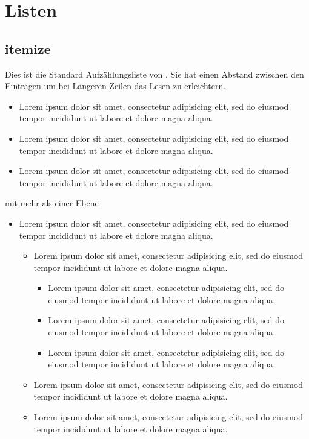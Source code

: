 \section{Listen}

\subsection{itemize}
Dies ist die Standard Aufzählungsliste von \LaTeXe. Sie hat einen Abstand zwischen den Einträgen um bei Längeren Zeilen das Lesen zu erleichtern.

\begin{itemize}
   \item Lorem ipsum dolor sit amet, consectetur adipisicing elit, sed do eiusmod tempor incididunt ut labore et dolore magna aliqua.
%
   \item Lorem ipsum dolor sit amet, consectetur adipisicing elit, sed do eiusmod tempor incididunt ut labore et dolore magna aliqua.
%
   \item Lorem ipsum dolor sit amet, consectetur adipisicing elit, sed do eiusmod tempor incididunt ut labore et dolore magna aliqua.
\end{itemize}

mit mehr als einer Ebene

\begin{itemize}
   \item Lorem ipsum dolor sit amet, consectetur adipisicing elit, sed do eiusmod tempor incididunt ut labore et dolore magna aliqua.
%
   \begin{itemize}
      \item Lorem ipsum dolor sit amet, consectetur adipisicing elit, sed do eiusmod tempor incididunt ut labore et dolore magna aliqua.
      \begin{itemize}
         \item Lorem ipsum dolor sit amet, consectetur adipisicing elit, sed do eiusmod tempor incididunt ut labore et dolore magna aliqua.
         \item Lorem ipsum dolor sit amet, consectetur adipisicing elit, sed do eiusmod tempor incididunt ut labore et dolore magna aliqua.
         \item Lorem ipsum dolor sit amet, consectetur adipisicing elit, sed do eiusmod tempor incididunt ut labore et dolore magna aliqua.
      \end{itemize}
      \item Lorem ipsum dolor sit amet, consectetur adipisicing elit, sed do eiusmod tempor incididunt ut labore et dolore magna aliqua.
      \item Lorem ipsum dolor sit amet, consectetur adipisicing elit, sed do eiusmod tempor incididunt ut labore et dolore magna aliqua.
   \end{itemize}
\end{itemize}

